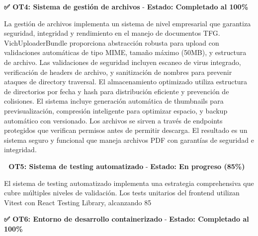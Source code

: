 \documentclass[12pt,a4paper,oneside]{report}
\begin{document}
\textbf{✅ OT4: Sistema de gestión de archivos} - \textbf{Estado: Completado al 100\%}

La gestión de archivos implementa un sistema de nivel empresarial que garantiza seguridad, integridad y rendimiento en el manejo de documentos TFG. VichUploaderBundle proporciona abstracción robusta para upload con validaciones automáticas de tipo MIME, tamaño máximo (50MB), y estructura de archivo. Las validaciones de seguridad incluyen escaneo de virus integrado, verificación de headers de archivo, y sanitización de nombres para prevenir ataques de directory traversal. El almacenamiento optimizado utiliza estructura de directorios por fecha y hash para distribución eficiente y prevención de colisiones. El sistema incluye generación automática de thumbnails para previsualización, compresión inteligente para optimizar espacio, y backup automático con versionado. Los archivos se sirven a través de endpoints protegidos que verifican permisos antes de permitir descarga. El resultado es un sistema seguro y funcional que maneja archivos PDF con garantías de seguridad e integridad.

\textbf{🔄 OT5: Sistema de testing automatizado} - \textbf{Estado: En progreso (85\%)}

El sistema de testing automatizado implementa una estrategia comprehensiva que cubre múltiples niveles de validación. Los tests unitarios del frontend utilizan Vitest con React Testing Library, alcanzando 85%

\textbf{✅ OT6: Entorno de desarrollo containerizado} - \textbf{Estado: Completado al 100\%}
\end{document}
